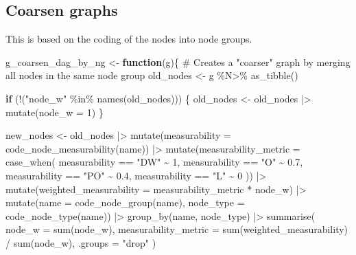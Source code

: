 \documentclass[
  letterpaper,
  DIV=11,
  numbers=noendperiod]{scrartcl}
\newenvironment{Shaded}{\begin{snugshade}}{\end{snugshade}}
\newcommand{\AttributeTok}[1]{\textcolor[rgb]{0.40,0.45,0.13}{#1}}
\newcommand{\CommentTok}[1]{\textcolor[rgb]{0.37,0.37,0.37}{#1}}
\newcommand{\ControlFlowTok}[1]{\textcolor[rgb]{0.00,0.23,0.31}{\textbf{#1}}}
\newcommand{\DecValTok}[1]{\textcolor[rgb]{0.68,0.00,0.00}{#1}}
\newcommand{\FloatTok}[1]{\textcolor[rgb]{0.68,0.00,0.00}{#1}}
\newcommand{\FunctionTok}[1]{\textcolor[rgb]{0.28,0.35,0.67}{#1}}
\newcommand{\NormalTok}[1]{\textcolor[rgb]{0.00,0.23,0.31}{#1}}
\newcommand{\OtherTok}[1]{\textcolor[rgb]{0.00,0.23,0.31}{#1}}
\newcommand{\SpecialCharTok}[1]{\textcolor[rgb]{0.37,0.37,0.37}{#1}}
\newcommand{\StringTok}[1]{\textcolor[rgb]{0.13,0.47,0.30}{#1}}
\begin{document}
\subsection{Coarsen graphs}\label{coarsen-graphs}

This is based on the coding of the nodes into node groups.

\begin{Shaded}
\begin{Highlighting}[]
\NormalTok{g\_coarsen\_dag\_by\_ng }\OtherTok{\textless{}{-}} \ControlFlowTok{function}\NormalTok{(g)\{}
    \CommentTok{\# Creates a "coarser" graph by merging all nodes in the same node group}
\NormalTok{    old\_nodes }\OtherTok{\textless{}{-}}\NormalTok{ g }\SpecialCharTok{\%N\textgreater{}\%} \FunctionTok{as\_tibble}\NormalTok{()}
    
    \ControlFlowTok{if}\NormalTok{ (}\SpecialCharTok{!}\NormalTok{(}\StringTok{"node\_w"} \SpecialCharTok{\%in\%} \FunctionTok{names}\NormalTok{(old\_nodes))) \{}
\NormalTok{        old\_nodes }\OtherTok{\textless{}{-}}\NormalTok{ old\_nodes }\SpecialCharTok{|\textgreater{}} 
            \FunctionTok{mutate}\NormalTok{(}\AttributeTok{node\_w =} \DecValTok{1}\NormalTok{)}
\NormalTok{    \}}
    
\NormalTok{    new\_nodes }\OtherTok{\textless{}{-}}\NormalTok{ old\_nodes }\SpecialCharTok{|\textgreater{}} 
        \FunctionTok{mutate}\NormalTok{(}\AttributeTok{measurability =} \FunctionTok{code\_node\_measurability}\NormalTok{(name)) }\SpecialCharTok{|\textgreater{}} 
        \FunctionTok{mutate}\NormalTok{(}\AttributeTok{measurability\_metric =} \FunctionTok{case\_when}\NormalTok{(}
\NormalTok{            measurability }\SpecialCharTok{==} \StringTok{"DW"} \SpecialCharTok{\textasciitilde{}} \DecValTok{1}\NormalTok{,}
\NormalTok{            measurability }\SpecialCharTok{==} \StringTok{"O"} \SpecialCharTok{\textasciitilde{}} \FloatTok{0.7}\NormalTok{,}
\NormalTok{            measurability }\SpecialCharTok{==} \StringTok{"PO"} \SpecialCharTok{\textasciitilde{}} \FloatTok{0.4}\NormalTok{,}
\NormalTok{            measurability }\SpecialCharTok{==} \StringTok{"L"} \SpecialCharTok{\textasciitilde{}} \DecValTok{0}
\NormalTok{        )) }\SpecialCharTok{|\textgreater{}} 
        \FunctionTok{mutate}\NormalTok{(}\AttributeTok{weighted\_measurability =}\NormalTok{ measurability\_metric }\SpecialCharTok{*}\NormalTok{ node\_w) }\SpecialCharTok{|\textgreater{}} 
        \FunctionTok{mutate}\NormalTok{(}\AttributeTok{name =} \FunctionTok{code\_node\_group}\NormalTok{(name),}
               \AttributeTok{node\_type =} \FunctionTok{code\_node\_type}\NormalTok{(name)) }\SpecialCharTok{|\textgreater{}} 
        \FunctionTok{group\_by}\NormalTok{(name, node\_type) }\SpecialCharTok{|\textgreater{}} 
        \FunctionTok{summarise}\NormalTok{(}
            \AttributeTok{node\_w =} \FunctionTok{sum}\NormalTok{(node\_w),}
            \AttributeTok{measurability\_metric =} \FunctionTok{sum}\NormalTok{(weighted\_measurability) }\SpecialCharTok{/} \FunctionTok{sum}\NormalTok{(node\_w), }
            \AttributeTok{.groups =} \StringTok{"drop"}
\NormalTok{        ) }
    

\end{Highlighting}
\end{Shaded}
\end{document}
